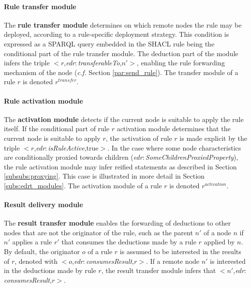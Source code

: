 \documentclass[sw]{iosart2x}
\newcommand{\namespace}[1]{\textit{#1$:$}}
\newcommand{\concept}[2]{\namespace{#1}\-\textit{#2}}
\newcommand{\triplet}[3]{$<$#1,\textit{#2},#3$>$}
\begin{document}
\paragraph{Rule transfer module}
The \textbf{rule transfer module} determines on which remote nodes the rule may be deployed, according to a rule-specific deployment strategy.
This condition is expressed as a SPARQL query embedded in the SHACL rule being the conditional part of the rule transfer module.
The deduction part of the module infers the triple \triplet{$r$}{\concept{edr}{transferable\-To}}{$n'$}, enabling the rule forwarding mechanism of the node (\textit{c.f.} Section \textsection \ref{par:send_rule}).
The transfer module of a rule $r$ is denoted $r^{transfer}$.


\paragraph{Rule activation module}
The \textbf{activation module} detects if the current node is suitable to apply the rule itself. 
If the conditional part of rule $r$ activation module determines that the current node is suitable to apply $r$, the activation of rule $r$ is made explicit by the triple \triplet{$r$}{\concept{edr}{is\-Rule\-Active}}{true}.
In the case where some node characteristics are conditionally proxied towards children (\concept{edr}{Some\-Children\-Proxied\-Property}), the rule activation module may infer reified statements as described in Section \textsection \ref{subsubs:proxying}. 
This case is illustrated in more detail in Section \textsection \ref{subs:edrt_modules}.
The activation module of a rule $r$ is denoted $r^{activation}$.

\paragraph{Result delivery module}
The \textbf{result transfer module} enables the forwarding of deductions to other nodes that are not the originator of the rule, such as the parent $n'$ of a node $n$ if $n'$ applies a rule $r'$ that consumes the deductions made by a rule $r$ applied by $n$.
By default, the originator $o$ of a rule $r$ is assumed to be interested in the results of $r$, denoted with \triplet{$o$}{\concept{edr}{consumes\-Result}}{$r$}.
If a remote node $n'$ is interested in the deductions made by rule $r$, the result transfer module infers that \triplet{$n'$}{\concept{edr}{consumes\-Result}}{$r$}.
\end{document}
